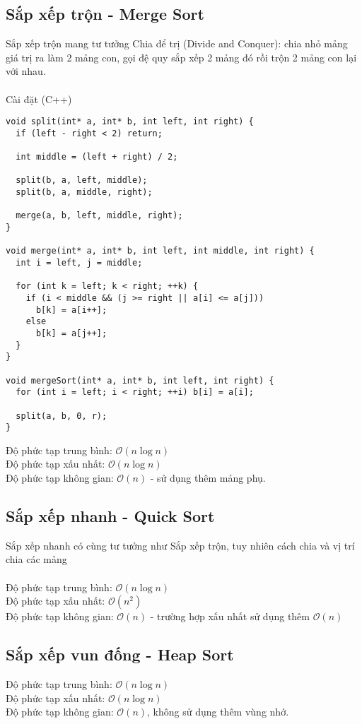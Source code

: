 \documentclass[]{article}
\begin{document}
\subsection{Sắp xếp trộn - Merge Sort}
Sắp xếp trộn mang tư tưởng Chia để trị (Divide and Conquer): chia nhỏ mảng giá trị ra làm 2 mảng con, gọi đệ quy sắp xếp 2 mảng đó rồi trộn 2 mảng con lại với nhau.
\\\\
Cài đặt (C++)
\begin{lstlisting}
void split(int* a, int* b, int left, int right) {
  if (left - right < 2) return;

  int middle = (left + right) / 2;

  split(b, a, left, middle);
  split(b, a, middle, right);

  merge(a, b, left, middle, right);
}

void merge(int* a, int* b, int left, int middle, int right) {
  int i = left, j = middle;

  for (int k = left; k < right; ++k) {
    if (i < middle && (j >= right || a[i] <= a[j]))
      b[k] = a[i++];
    else
      b[k] = a[j++];
  }
}

void mergeSort(int* a, int* b, int left, int right) {
  for (int i = left; i < right; ++i) b[i] = a[i];

  split(a, b, 0, r);
}
\end{lstlisting}
Độ phức tạp trung bình: $\mathcal{O}(n \log n)$
\\
Độ phức tạp xấu nhất: $\mathcal{O}(n \log n)$
\\
Độ phức tạp không gian: $\mathcal{O}(n)$ - sử dụng thêm mảng phụ.
\subsection{Sắp xếp nhanh - Quick Sort}
Sắp xếp nhanh có cùng tư tưởng như Sắp xếp trộn, tuy nhiên cách chia và vị trí chia các mảng
\\\\
Độ phức tạp trung bình: $\mathcal{O}(n \log n)$
\\
Độ phức tạp xấu nhất: $\mathcal{O}(n^2)$
\\
Độ phức tạp không gian: $\mathcal{O}(n)$ - trường hợp xấu nhất sử dụng thêm $\mathcal{O}(n)$
\subsection{Sắp xếp vun đống - Heap Sort}
Độ phức tạp trung bình: $\mathcal{O}(n \log n)$
\\
Độ phức tạp xấu nhất: $\mathcal{O}(n \log n)$
\\
Độ phức tạp không gian: $\mathcal{O}(n)$, không sử dụng thêm vùng nhớ.
\end{document}
